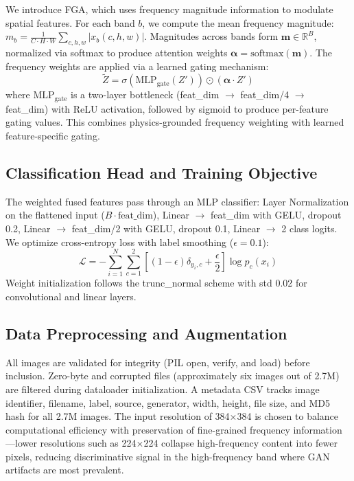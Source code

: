 \documentclass[journal]{IEEEtran}
\begin{document}
We introduce FGA, which uses frequency magnitude information to modulate spatial features. For each band $b$, we compute the mean frequency magnitude: $m_b = \frac{1}{C \cdot H \cdot W} \sum_{c,h,w} |x_b(c,h,w)|$. Magnitudes across bands form $\mathbf{m} \in \mathbb{R}^B$, normalized via softmax to produce attention weights $\boldsymbol{\alpha} = \text{softmax}(\mathbf{m})$. The frequency weights are applied via a learned gating mechanism:
\begin{equation}
\tilde{Z} = \sigma(\text{MLP}_{\text{gate}}(Z')) \odot (\boldsymbol{\alpha} \cdot Z')
\label{eq:fga}
\end{equation}
where $\text{MLP}_{\text{gate}}$ is a two-layer bottleneck (feat\_dim $\rightarrow$ feat\_dim/4 $\rightarrow$ feat\_dim) with ReLU activation, followed by sigmoid to produce per-feature gating values. This combines physics-grounded frequency weighting with learned feature-specific gating.

\subsection{Classification Head and Training Objective}
The weighted fused features pass through an MLP classifier: Layer Normalization on the flattened input ($B \cdot \text{feat\_dim}$), Linear $\rightarrow$ feat\_dim with GELU, dropout 0.2, Linear $\rightarrow$ feat\_dim/2 with GELU, dropout 0.1, Linear $\rightarrow$ 2 class logits. We optimize cross-entropy loss with label smoothing ($\epsilon=0.1$):
\begin{equation}
\mathcal{L} = -\sum_{i=1}^N \sum_{c=1}^2 [(1-\epsilon)\delta_{y_i,c} + \frac{\epsilon}{2}] \log p_c(x_i)
\label{eq:loss}
\end{equation}
Weight initialization follows the trunc\_normal scheme with std 0.02 for convolutional and linear layers.

\subsection{Data Preprocessing and Augmentation}
All images are validated for integrity (PIL open, verify, and load) before inclusion. Zero-byte and corrupted files (approximately six images out of 2.7M) are filtered during dataloader initialization. A metadata CSV tracks image identifier, filename, label, source, generator, width, height, file size, and MD5 hash for all 2.7M images. The input resolution of 384$\times$384 is chosen to balance computational efficiency with preservation of fine-grained frequency information---lower resolutions such as 224$\times$224 collapse high-frequency content into fewer pixels, reducing discriminative signal in the high-frequency band where GAN artifacts are most prevalent.
\end{document}

